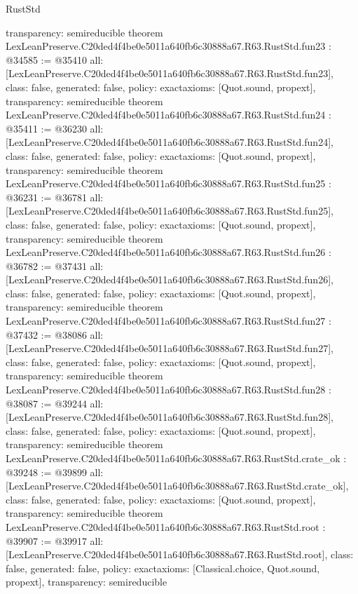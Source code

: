 \begin{lexlean}{RustStd}
\begin{coremodule}
{  transparency: semireducible
}
theorem LexLeanPreserve.C20ded4f4be0e5011a640fb6c30888a67.R63.RustStd.fun23 : @34585 := @35410 {
  all: [LexLeanPreserve.C20ded4f4be0e5011a640fb6c30888a67.R63.RustStd.fun23],
  class: false,
  generated: false,
  policy: exact{axioms: [Quot.sound, propext]},
  transparency: semireducible
}
theorem LexLeanPreserve.C20ded4f4be0e5011a640fb6c30888a67.R63.RustStd.fun24 : @35411 := @36230 {
  all: [LexLeanPreserve.C20ded4f4be0e5011a640fb6c30888a67.R63.RustStd.fun24],
  class: false,
  generated: false,
  policy: exact{axioms: [Quot.sound, propext]},
  transparency: semireducible
}
theorem LexLeanPreserve.C20ded4f4be0e5011a640fb6c30888a67.R63.RustStd.fun25 : @36231 := @36781 {
  all: [LexLeanPreserve.C20ded4f4be0e5011a640fb6c30888a67.R63.RustStd.fun25],
  class: false,
  generated: false,
  policy: exact{axioms: [Quot.sound, propext]},
  transparency: semireducible
}
theorem LexLeanPreserve.C20ded4f4be0e5011a640fb6c30888a67.R63.RustStd.fun26 : @36782 := @37431 {
  all: [LexLeanPreserve.C20ded4f4be0e5011a640fb6c30888a67.R63.RustStd.fun26],
  class: false,
  generated: false,
  policy: exact{axioms: [Quot.sound, propext]},
  transparency: semireducible
}
theorem LexLeanPreserve.C20ded4f4be0e5011a640fb6c30888a67.R63.RustStd.fun27 : @37432 := @38086 {
  all: [LexLeanPreserve.C20ded4f4be0e5011a640fb6c30888a67.R63.RustStd.fun27],
  class: false,
  generated: false,
  policy: exact{axioms: [Quot.sound, propext]},
  transparency: semireducible
}
theorem LexLeanPreserve.C20ded4f4be0e5011a640fb6c30888a67.R63.RustStd.fun28 : @38087 := @39244 {
  all: [LexLeanPreserve.C20ded4f4be0e5011a640fb6c30888a67.R63.RustStd.fun28],
  class: false,
  generated: false,
  policy: exact{axioms: [Quot.sound, propext]},
  transparency: semireducible
}
theorem LexLeanPreserve.C20ded4f4be0e5011a640fb6c30888a67.R63.RustStd.crate_ok : @39248 := @39899 {
  all: [LexLeanPreserve.C20ded4f4be0e5011a640fb6c30888a67.R63.RustStd.crate_ok],
  class: false,
  generated: false,
  policy: exact{axioms: [Quot.sound, propext]},
  transparency: semireducible
}
theorem LexLeanPreserve.C20ded4f4be0e5011a640fb6c30888a67.R63.RustStd.root : @39907 := @39917 {
  all: [LexLeanPreserve.C20ded4f4be0e5011a640fb6c30888a67.R63.RustStd.root],
  class: false,
  generated: false,
  policy: exact{axioms: [Classical.choice, Quot.sound, propext]},
  transparency: semireducible
}


\end{coremodule}
\end{lexlean}

